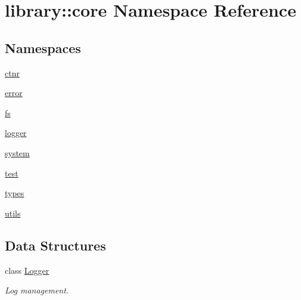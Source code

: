 \hypertarget{namespacelibrary_1_1core}{}\section{library\+:\+:core Namespace Reference}
\label{namespacelibrary_1_1core}
\subsection*{Namespaces}
\begin{DoxyCompactItemize}
\item 
 \hyperlink{namespacelibrary_1_1core_1_1ctnr}{ctnr}
\item 
 \hyperlink{namespacelibrary_1_1core_1_1error}{error}
\item 
 \hyperlink{namespacelibrary_1_1core_1_1fs}{fs}
\item 
 \hyperlink{namespacelibrary_1_1core_1_1logger}{logger}
\item 
 \hyperlink{namespacelibrary_1_1core_1_1system}{system}
\item 
 \hyperlink{namespacelibrary_1_1core_1_1test}{test}
\item 
 \hyperlink{namespacelibrary_1_1core_1_1types}{types}
\item 
 \hyperlink{namespacelibrary_1_1core_1_1utils}{utils}
\end{DoxyCompactItemize}
\subsection*{Data Structures}
\begin{DoxyCompactItemize}
\item 
class \hyperlink{classlibrary_1_1core_1_1Logger}{Logger}
\begin{DoxyCompactList}\small\item\em Log management. \end{DoxyCompactList}\end{DoxyCompactItemize}
